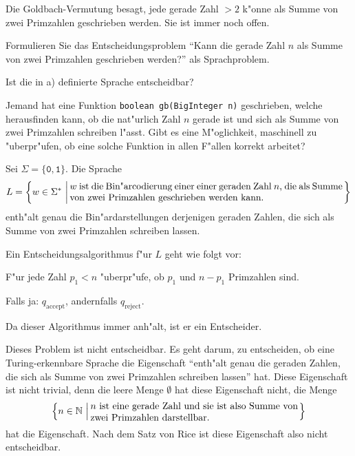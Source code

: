 Die Goldbach-Vermutung besagt, jede gerade Zahl $> 2$ k"onne als Summe von
zwei Primzahlen geschrieben werden. Sie ist immer noch offen.
\begin{teilaufgaben}
\item Formulieren Sie das Entscheidungsproblem ``Kann die gerade Zahl $n$
als Summe von zwei Primzahlen geschrieben werden?'' als Sprachproblem.
\item Ist die in a) definierte Sprache entscheidbar?
\item Jemand hat eine Funktion \texttt{boolean gb(BigInteger n)} geschrieben,
welche herausfinden kann, ob die nat"urlich Zahl $n$ gerade ist und sich
als Summe von zwei Primzahlen schreiben l"asst. Gibt es eine M"oglichkeit,
maschinell zu "uberpr"ufen, ob eine solche Funktion in allen F"allen
korrekt arbeitet?
\end{teilaufgaben}

\begin{loesung}
\begin{teilaufgaben}
\item Sei $\Sigma=\{\texttt{0},\texttt{1}\}$. Die Sprache
\[
L=\left\{ w\in\Sigma^*\,\left|\, \begin{minipage}{4truein}
$w$ ist die Bin"arcodierung einer einer geraden Zahl $n$, die
als Summe von zwei Primzahlen geschrieben werden kann.
\end{minipage}
\right.\right\}
\]
enth"alt genau die Bin"ardarstellungen derjenigen geraden Zahlen,
die sich als Summe von zwei Primzahlen schreiben lassen.
\item Ein Entscheidungsalgorithmus f"ur $L$ geht wie folgt vor:
\begin{compactenum}
\item F"ur jede Zahl $p_1<n$ "uberpr"ufe, ob $p_1$ und $n-p_1$ Primzahlen
sind.
\item Falls ja: $q_{\text{accept}}$, andernfalls $q_{\text{reject}}$.
\end{compactenum}
Da dieser Algorithmus immer anh"alt, ist er ein Entscheider.
\item Dieses Problem ist nicht entscheidbar.
Es geht darum, zu entscheiden, ob eine Turing-erkennbare Sprache
die Eigenschaft
``enth"alt genau die geraden Zahlen, die sich als Summe von zwei Primzahlen
schreiben lassen''
hat.
Diese Eigenschaft ist nicht trivial, denn die leere Menge $\emptyset$ hat
diese Eigenschaft nicht, die Menge
\[
\left\{ n\in\mathbb N\,\left|\,
\begin{minipage}{3truein}
$n$ ist eine gerade Zahl und sie ist also Summe von zwei Primzahlen
darstellbar.
\end{minipage}\right.\right\}
\]
hat die Eigenschaft.
Nach dem Satz von Rice ist diese Eigenschaft also nicht entscheidbar.
\qedhere
\end{teilaufgaben}
\end{loesung}


